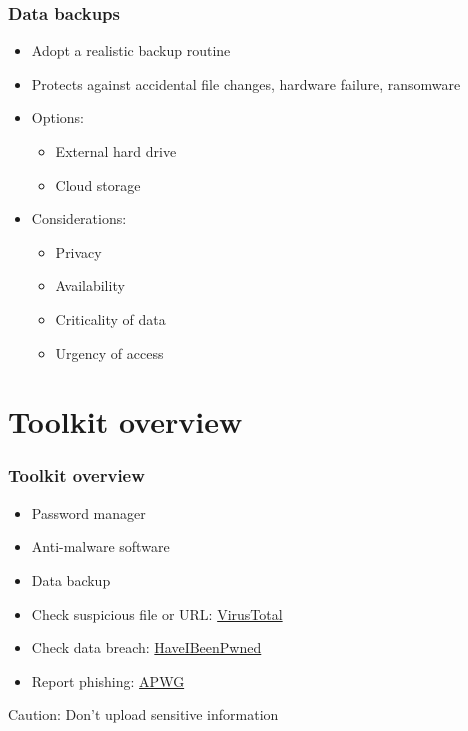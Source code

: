 \documentclass[blue]{beamer}
\begin{document}
\begin{frame}
\frametitle{Data backups}

\begin{itemize}
  \item Adopt a realistic backup routine
  \item Protects against accidental file changes, hardware failure, ransomware
  \item Options:
  \begin{itemize}
    \item External hard drive
    \item Cloud storage
  \end{itemize}
  \item Considerations:
  \begin{itemize}
    \item Privacy
    \item Availability
    \item Criticality of data
    \item Urgency of access
  \end{itemize}
\end{itemize}

\end{frame}



\section{Toolkit overview}



\begin{frame}
\frametitle{Toolkit overview}

\begin{itemize}
  \item Password manager
  \item Anti-malware software
  \item Data backup
  \item Check suspicious file or URL: \href{https://www.virustotal.com/gui/}{VirusTotal}
  \item Check data breach: \href{https://haveibeenpwned.com}{HaveIBeenPwned}
  \item Report phishing: \href{https://apwg.org/reportphishing}{APWG}
\end{itemize}

\begin{alertblock}{Caution:}
Don't upload sensitive information
\end{alertblock}

\end{frame}
\end{document}
